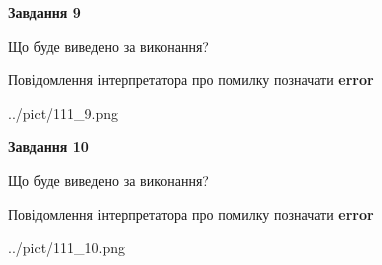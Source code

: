 \documentclass[12pt, ukrainian]{article}
\begin{document}
{{\begin {center}\textbf{Завдання 9}\end {center}}\par
Що буде виведено за виконання? \par
Повідомлення інтерпретатора про помилку позначати \textbf{error}

\begin{center}
	{../pict/111_9.png}
\end{center}
\newpage

{\begin {center}\textbf{Завдання 10}\end {center}}\par
Що буде виведено за виконання? \par
Повідомлення інтерпретатора про помилку позначати \textbf{error}

\begin{center}
	{../pict/111_10.png}
\end{center}
\newpage

}
\end{document}
